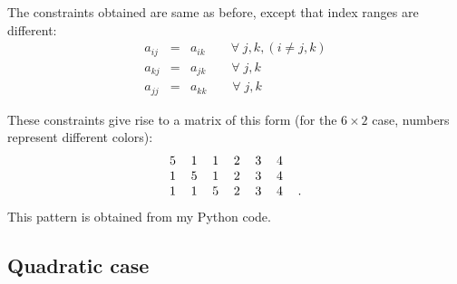 The constraints obtained are same as before, except that index ranges are different:
\begin{eqnarray}
a_{ij} &=& a_{ik} \quad \quad \forall \;  j, k, (i \neq j, k) \nonumber \\
a_{kj} &=& a_{jk} \quad \quad \forall \;  j, k \nonumber \\
a_{jj} &=& a_{kk} \quad \quad \forall \;  j, k \nonumber
\end{eqnarray}

These constraints give rise to a matrix of this form (for the $6 \times 2$ case, numbers represent different colors):
\begin{equation}
\begin{tabular}{c c c c c c c}
5 & 1 & 1 & 2 & 3 & 4 & \\
1 & 5 & 1 & 2 & 3 & 4 & \\
1 & 1 & 5 & 2 & 3 & 4 & .
\end{tabular} 
\end{equation}This pattern is obtained from my Python code.

\subsection{Quadratic case}

